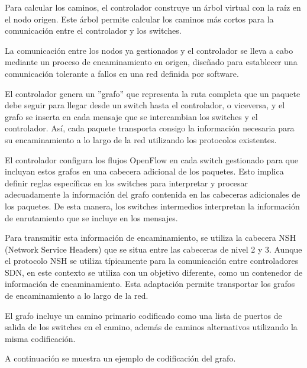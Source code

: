 \documentclass[a4paper, 12pt]{book}
\begin{document}
	Para calcular los caminos, el controlador construye un árbol virtual con la raíz en el nodo origen. Este árbol permite calcular los caminos más cortos para la comunicación entre el controlador y los switches.
		
	La comunicación entre los nodos ya gestionados y el controlador se lleva a cabo mediante un proceso de encaminamiento en origen, diseñado para establecer una comunicación tolerante a fallos en una red definida por software. 
	
	El controlador genera un ''grafo'' que representa la ruta completa que un paquete debe seguir para llegar desde un switch hasta el controlador, o viceversa, y el grafo se inserta en cada mensaje que se intercambian los switches y el controlador. Así, cada paquete transporta consigo la información necesaria para su encaminamiento a lo largo de la red utilizando los protocolos existentes.
	
	El controlador configura los flujos OpenFlow en cada switch gestionado para que incluyan estos grafos en una cabecera adicional de los paquetes. Esto implica definir reglas específicas en los switches para interpretar y procesar adecuadamente la información del grafo contenida en las cabeceras adicionales de los paquetes. De esta manera, los switches intermedios interpretan la información de enrutamiento que se incluye en los mensajes.
	
	Para transmitir esta información de encaminamiento, se utiliza la cabecera NSH (Network Service Headers) que se situa entre las cabeceras de nivel 2 y 3. Aunque el protocolo NSH se utiliza típicamente para la comunicación entre controladores SDN, en este contexto se utiliza con un objetivo diferente, como un contenedor de información de encaminamiento. Esta adaptación permite transportar los grafos de encaminamiento a lo largo de la red.
	
	El grafo incluye un camino primario codificado como una lista de puertos de salida de los switches en el camino, además de caminos alternativos utilizando la misma codificación.
	
	A continuación se muestra un ejemplo de codificación del grafo.
	
\end{document}
